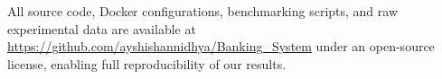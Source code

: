 \documentclass[journal]{IEEEtran}
\begin{document}
All source code, Docker configurations, benchmarking scripts, and raw experimental data are available at \url{https://github.com/ayshishannidhya/Banking_System} under an open-source license, enabling full reproducibility of our results.




\end{document}
